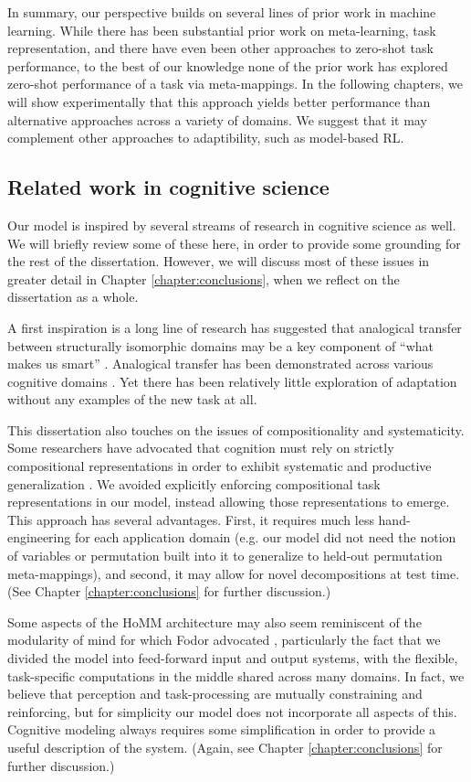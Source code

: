 In summary, our perspective builds on several lines of prior work in machine learning. While there has been substantial prior work on meta-learning, task representation, and there have even been other approaches to zero-shot task performance, to the best of our knowledge none of the prior work has explored zero-shot performance of a task via meta-mappings. In the following chapters, we will show experimentally that this approach yields better performance than alternative approaches across a variety of domains. We suggest that it may complement other approaches to adaptibility, such as model-based RL.

\subsection{Related work in cognitive science}
Our model is inspired by several streams of research in cognitive science as well. We will briefly review some of these here, in order to provide some grounding for the rest of the dissertation. However, we will discuss most of these issues in greater detail in Chapter \ref{chapter:conclusions}, when we reflect on the dissertation as a whole.   

A first inspiration is a long line of research has suggested that analogical transfer between structurally isomorphic domains may be a key component of ``what makes us smart'' \citep{Gentner2003}. Analogical transfer has been demonstrated across various cognitive domains \citep[e.g.][]{Bourne1970, Day2011}. Yet there has been relatively little exploration of adaptation without any examples of the new task at all. 

This dissertation also touches on the issues of compositionality and systematicity. Some researchers have advocated that cognition must rely on strictly compositional representations in order to exhibit systematic and productive generalization \citep[e.g.][]{Fodor2001,Lake2017}.  We avoided explicitly enforcing compositional task representations in our model, instead allowing those representations to emerge. This approach has several advantages. First, it requires much less hand-engineering for each application domain (e.g. our model did not need the notion of variables or permutation built into it to generalize to held-out permutation meta-mappings), and second, it may allow for novel decompositions at test time. (See Chapter \ref{chapter:conclusions} for further discussion.) 

Some aspects of the HoMM architecture may also seem reminiscent of the modularity of mind for which Fodor advocated \citep{Fodor1983modularity}, particularly the fact that we divided the model into feed-forward input and output systems, with the flexible, task-specific computations in the middle shared across many domains. In fact, we believe that perception and task-processing are mutually constraining and reinforcing, but for simplicity our model does not incorporate all aspects of this. Cognitive modeling always requires some simplification in order to provide a useful description of the system. (Again, see Chapter \ref{chapter:conclusions} for further discussion.)   

